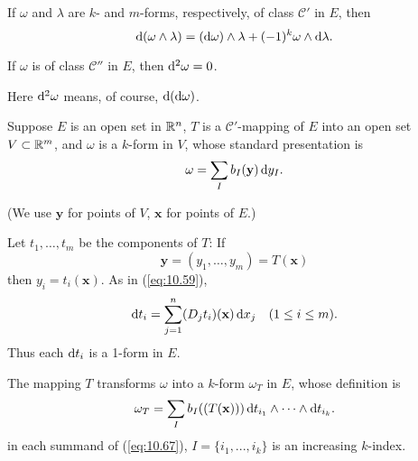 \begin{thm}
    \label{thm:10.20}
    \begin{asparaenum}[(a)]
        \item If $\omega$ and $\lambda$ are $k$- and $m$-forms, respectively, of class $\mathscr{C}'$ in $E$, 
        then 
        \begin{equation}
            \label{eq:10.63}
            \d (\omega \wedge \lambda) =
            (\d \omega) \wedge \lambda +
            (-1)^k \omega \wedge \d \lambda .
        \end{equation}
        \item If $\omega$ is of class $\mathscr{C}''$ in $E$, then $\d ^2 \omega = 0$.
    \end{asparaenum}
\end{thm}

Here $\d ^2 \omega$ means, of course, $\d (\d \omega)$.


\begin{mydef}
    Suppose $E$ is an open set in ${\protect\mathbb R}^n$, 
    $T$ is a $\mathscr{C}'$-mapping of $E$ into an open set $V \subset {\protect\mathbb R}^m$, 
    and $\omega$ is a $k$-form in $V$, whose standard presentation is
    \begin{equation}
        \label{eq:10.65}
        \omega = \sum_{I} b_I (\mathbf{y}) \d y_I.
    \end{equation}

    (We use $\mathbf{y}$ for points of $V$, $\mathbf{x}$ for points of $E$.)

    Let $t_1,\dots,t_m$ be the components of $T$: If 
    \begin{equation*}
        \mathbf{y} = (y_1, \dots, y_m) = T(\mathbf{x})
    \end{equation*}
    then $y_i = t_i(\mathbf{x})$.
    As in (\ref*{eq:10.59}),
    \begin{equation}
        \label{eq:10.66}
        \d t_i = \sum_{j=1}^{n}(D_j t_i)(\mathbf{x}) \d x_j
        \quad (1 \leq i \leq m).
    \end{equation}
    Thus each $\d t_i$ is a 1-form in $E$.

    The mapping $T$ transforms $\omega$ into a $k$-form $\omega_T$ in $E$,
    whose definition is 
    \begin{equation}
        \label{eq:10.67}
        \omega_T = \sum_I b_I ((T(\mathbf{x}))) 
        \d t_{i_1} \wedge \cdots \wedge
        \d t_{i_k} .
    \end{equation}
    in each summand of (\ref{eq:10.67}),
    $I = \{i_1,...,i_k\}$ is an increasing $k$-index.
\end{mydef}

